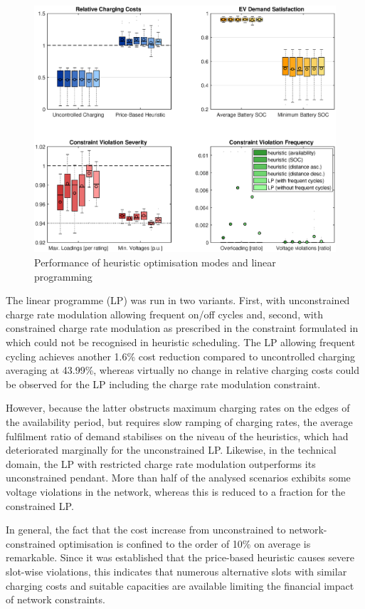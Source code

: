 \begin{figure}[]
	\includegraphics[width=\textwidth,trim={2.9cm 1.5cm 2.5cm 0cm},clip]{figures/evaluation/heulp.eps}
	\caption{Performance of heuristic optimisation modes and linear programming}
	\label{fig:heulp}
\end{figure}

The linear programme (LP) was run in two variants. First, with unconstrained charge rate modulation allowing frequent on/off cycles and, second, with constrained charge rate modulation as prescribed in the constraint formulated in  which could not be recognised in heuristic scheduling. The LP allowing frequent cycling achieves another 1.6\% cost reduction compared to uncontrolled charging averaging at 43.99\%, whereas virtually no change in relative charging costs could be observed for the LP including the charge rate modulation constraint. 

However, because the latter obstructs maximum charging rates on the edges of the availability period, but requires slow ramping of charging rates, the average fulfilment ratio of demand stabilises on the niveau of the heuristics, which had deteriorated marginally for the unconstrained LP. Likewise, in the technical domain, the LP with restricted charge rate modulation outperforms its unconstrained pendant. More than half of the analysed scenarios exhibits some voltage violations in the network, whereas this is reduced to a fraction for the constrained LP.

In general, the fact that the cost increase from unconstrained to network-constrained optimisation is confined to the order of 10\% on average is remarkable. Since it was established that the price-based heuristic causes severe slot-wise violations, this indicates that numerous alternative slots with similar charging costs and suitable capacities are available limiting the financial impact of network constraints.

